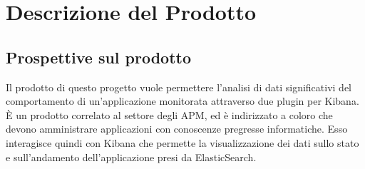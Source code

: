 \section{Descrizione del Prodotto} \label{descrizione}
	\subsection{Prospettive sul prodotto}
	Il prodotto di questo progetto vuole permettere l'analisi di dati significativi del comportamento di un'applicazione monitorata attraverso due plugin per Kibana.
	È un prodotto correlato al settore degli APM, ed è indirizzato a coloro che devono amministrare applicazioni con conoscenze pregresse informatiche. Esso interagisce quindi con Kibana che permette la visualizzazione dei dati sullo stato e sull'andamento dell'applicazione presi da ElasticSearch.

